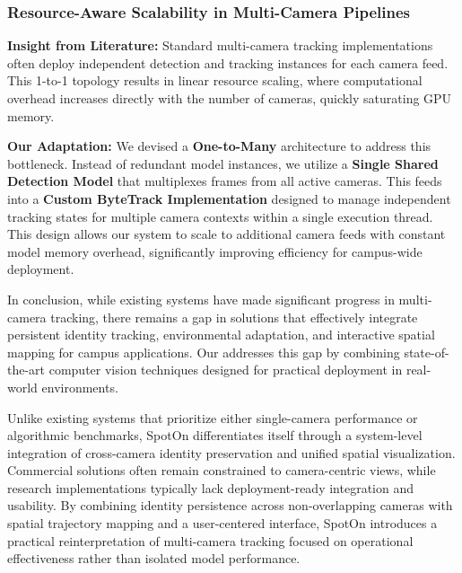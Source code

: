 \subsubsection{Resource-Aware Scalability in Multi-Camera Pipelines}
\textbf{Insight from Literature:} Standard multi-camera tracking implementations often deploy independent detection and tracking instances for each camera feed. This 1-to-1 topology results in linear resource scaling, where computational overhead increases directly with the number of cameras, quickly saturating GPU memory.
\par
\textbf{Our Adaptation:} We devised a \textbf{One-to-Many} architecture to address this bottleneck. Instead of redundant model instances, we utilize a \textbf{Single Shared Detection Model} that multiplexes frames from all active cameras. This feeds into a \textbf{Custom ByteTrack Implementation} designed to manage independent tracking states for multiple camera contexts within a single execution thread. This design allows our system to scale to additional camera feeds with constant model memory overhead, significantly improving efficiency for campus-wide deployment.

In conclusion, while existing systems have made significant progress in multi-camera tracking, there remains a gap in solutions that effectively integrate persistent identity tracking, environmental adaptation, and interactive spatial mapping for campus applications. Our \usevar{\srsTitle} addresses this gap by combining state-of-the-art computer vision techniques designed for practical deployment in real-world environments.

Unlike existing systems that prioritize either single-camera performance or algorithmic benchmarks, SpotOn differentiates itself through a system-level integration of cross-camera identity preservation and unified spatial visualization. Commercial solutions often remain constrained to camera-centric views, while research implementations typically lack deployment-ready integration and usability. By combining identity persistence across non-overlapping cameras with spatial trajectory mapping and a user-centered interface, SpotOn introduces a practical reinterpretation of multi-camera tracking focused on operational effectiveness rather than isolated model performance.